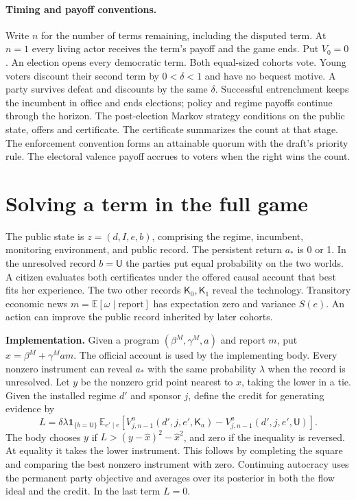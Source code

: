 \documentclass[11pt,letterpaper]{article}
\newcommand{\E}{\mathbb E}\newcommand{\one}{\mathbf 1}\newcommand{\UU}{\mathsf U}
\newcommand{\Krec}{\mathsf K}
\newcommand{\statement}[1]{\textbf{#1}\enspace}
\begin{document}
\paragraph{Timing and payoff conventions.}
Write \(n\) for the number of terms remaining, including the disputed term. At \(n=1\) every living actor receives the term's payoff and the game ends. Put \(V_0=0\). An election opens every democratic term. Both equal-sized cohorts vote. Young voters discount their second term by \(0<\delta<1\) and have no bequest motive. A party survives defeat and discounts by the same \(\delta\). Successful entrenchment keeps the incumbent in office and ends elections; policy and regime payoffs continue through the horizon. The post-election Markov strategy conditions on the public state, offers and certificate. The certificate summarizes the count at that stage. The enforcement convention forms an attainable quorum with the draft's priority rule. The electoral valence payoff accrues to voters when the right wins the count.

\newpage
\section{Solving a term in the full game}\label{sec:one}
The public state is \(z=(d,I,e,b)\), comprising the regime, incumbent, monitoring environment, and public record. The persistent return \(a_*\) is 0 or 1. In the unresolved record \(b=\UU\) the parties put equal probability on the two worlds. A citizen evaluates both certificates under the offered causal account that best fits her experience. The two other records \(\Krec_0,\Krec_1\) reveal the technology. Transitory economic news \(m=\E[\omega\mid\text{report}]\) has expectation zero and variance \(S(e)\). An action can improve the public record inherited by later cohorts.

\statement{Implementation.} Given a program \((\beta^M,\gamma^M,a)\) and report \(m\), put \(\widehat x=\beta^M+\gamma^M a m\). The official account is used by the implementing body. Every nonzero instrument can reveal \(a_*\) with the same probability \(\lambda\) when the record is unresolved. Let \(y\) be the nonzero grid point nearest to \(\widehat x\), taking the lower in a tie. Given the installed regime \(d'\) and sponsor \(j\), define the credit for generating evidence by
\[
 L=\delta\lambda\one_{\{b=\UU\}}\,
 \E_{e'\mid e}\!\left[V_{j,n-1}^{a}(d',j,e',\Krec_a)-
                        V_{j,n-1}^{a}(d',j,e',\UU)\right].
\]
The body chooses \(y\) if \(L>(y-\widehat x)^2-\widehat x^2\), and zero if the inequality is reversed. At equality it takes the lower instrument. This follows by completing the square and comparing the best nonzero instrument with zero. Continuing autocracy uses the permanent party objective and averages over its posterior in both the flow ideal and the credit. In the last term \(L=0\).
\end{document}

